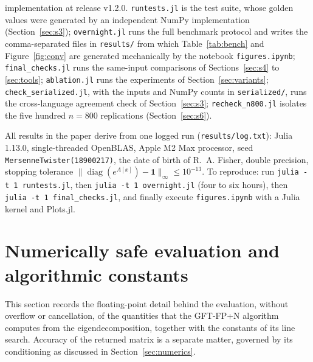 \documentclass[11pt]{article}
\newcommand{\diag}{\operatorname{diag}}
\newcommand{\one}{\mathbf{1}}
\begin{document}
implementation at release v1.2.0.
\texttt{runtests.jl} is the test suite, whose golden values were
generated by an independent NumPy implementation
(Section~\ref{sec:s3}); \texttt{overnight.jl} runs the full benchmark
protocol and
writes the comma-separated files in \texttt{results/} from which
Table~\ref{tab:bench} and Figure~\ref{fig:conv} are generated
mechanically by the
notebook \texttt{figures.ipynb}; \texttt{final\_checks.jl} runs the
same-input comparisons of
Sections~\ref{sec:s4} to \ref{sec:tools}; \texttt{ablation.jl} runs
the experiments of Section~\ref{sec:variants};
\texttt{check\_serialized.jl}, with the inputs and NumPy counts in
\texttt{serialized/}, runs the cross-language agreement check of
Section~\ref{sec:s3}; \texttt{recheck\_n800.jl}
isolates the five hundred
$n=800$ replications (Section~\ref{sec:s6}).

All results in the paper derive from one logged run
(\texttt{results/log.txt}): Julia 1.13.0, single-threaded OpenBLAS,
Apple M2 Max processor, seed \texttt{MersenneTwister(18900217)}, the
date of birth of R.~A. Fisher, double precision, stopping tolerance
$\|\diag(e^{A[x]})-\one\|_{\infty}\leq10^{-13}$. To reproduce: run
\texttt{julia -t 1 runtests.jl}, then \texttt{julia -t 1 overnight.jl}
(four to six hours), then \texttt{julia -t 1 final\_checks.jl}, and
finally execute \texttt{figures.ipynb} with a Julia kernel and
Plots.jl.

\section{Numerically safe evaluation and algorithmic constants}\label{sec:s2}

This section records the floating-point detail behind the evaluation,
without overflow or cancellation, of the quantities that the GFT-FP+N
algorithm computes from the eigendecomposition, together with the
constants of its line search. Accuracy of the returned matrix is a
separate matter, governed by its conditioning as discussed in
Section~\ref{sec:numerics}.
\end{document}
